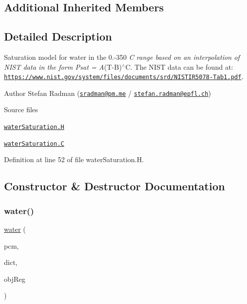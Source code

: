 \subsection*{Additional Inherited Members}


\subsection{Detailed Description}
Saturation model for water in the 0.-\/350 {\itshape C range based on an interpolation of N\+I\+ST data in the form Psat = A}(T-\/B)$^\wedge$C. The N\+I\+ST data can be found at\+: \href{https://www.nist.gov/system/files/documents/srd/NISTIR5078-Tab1.pdf}{\tt https\+://www.\+nist.\+gov/system/files/documents/srd/\+N\+I\+S\+T\+I\+R5078-\/\+Tab1.\+pdf}. 

\label{_Description}%
 Author Stefan Radman (\href{mailto:sradman@pm.me}{\tt sradman@pm.\+me} / \href{mailto:stefan.radman@epfl.ch}{\tt stefan.\+radman@epfl.\+ch})

\begin{DoxyParagraph}{Source files}

\begin{DoxyItemize}
\item \href{../../../home/carlo/data/GeN-Foam/GeN-Foam_ffn/GeN-Foam/GeN-Foam/classes/thermalHydraulics/src/physicsModels/phaseChangeModels/saturationModels/water/waterSaturation.H}{\tt water\+Saturation.\+H} 
\item \href{../../../home/carlo/data/GeN-Foam/GeN-Foam_ffn/GeN-Foam/GeN-Foam/classes/thermalHydraulics/src/physicsModels/phaseChangeModels/saturationModels/water/waterSaturation.C}{\tt water\+Saturation.\+C} 
\end{DoxyItemize}
\end{DoxyParagraph}


Definition at line 52 of file water\+Saturation.\+H.



\subsection{Constructor \& Destructor Documentation}
\mbox{\label{classFoam_1_1saturationModels_1_1water_a7a3a2ede223d47af06e2e4db4d181364}} 
\subsubsection{\texorpdfstring{water()}{water()}}
{\footnotesize\ttfamily \hyperlink{classFoam_1_1saturationModels_1_1water}{water} (\begin{DoxyParamCaption}\item[{const \hyperlink{classFoam_1_1phaseChangeModel}{phase\+Change\+Model} \&}]{pcm,  }\item[{const dictionary \&}]{dict,  }\item[{const object\+Registry \&}]{obj\+Reg }\end{DoxyParamCaption})}



